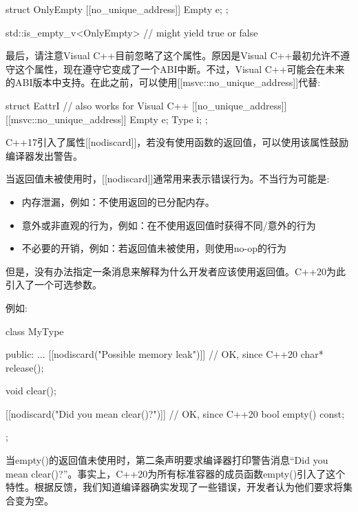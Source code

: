 \begin{cpp}
struct OnlyEmpty {
	[[no_unique_address]] Empty e;
};

std::is_empty_v<OnlyEmpty> // might yield true or false
\end{cpp}

最后，请注意Visual C++目前忽略了这个属性。原因是Visual C++最初允许不遵守这个属性，现在遵守它变成了一个ABI中断。不过，Visual C++可能会在未来的ABI版本中支持。在此之前，可以使用[[msvc::no\_unique\_address]]代替:

\begin{cpp}
struct EattrI { // also works for Visual C++
	[[no_unique_address]] [[msvc::no_unique_address]] Empty e;
	Type i;
};
\end{cpp}


C++17引入了属性[[nodiscard]]，若没有使用函数的返回值，可以使用该属性鼓励编译器发出警告。

当返回值未被使用时，[[nodiscard]]通常用来表示错误行为。不当行为可能是:

\begin{itemize}
\item
内存泄漏，例如：不使用返回的已分配内存。

\item
意外或非直观的行为，例如：在不使用返回值时获得不同/意外的行为

\item
不必要的开销，例如：若返回值未被使用，则使用no-op的行为
\end{itemize}

但是，没有办法指定一条消息来解释为什么开发者应该使用返回值。C++20为此引入了一个可选参数。

例如:

\begin{cpp}
class MyType {
	public:
	...
	[[nodiscard("Possible memory leak")]] // OK, since C++20
	char* release();

	void clear();

	[[nodiscard("Did you mean clear()?")]] // OK, since C++20
	bool empty() const;
};
\end{cpp}

当empty()的返回值未使用时，第二条声明要求编译器打印警告消息“Did you mean clear()?”。事实上，C++20为所有标准容器的成员函数empty()引入了这个特性。根据反馈，我们知道编译器确实发现了一些错误，开发者认为他们要求将集合变为空。


